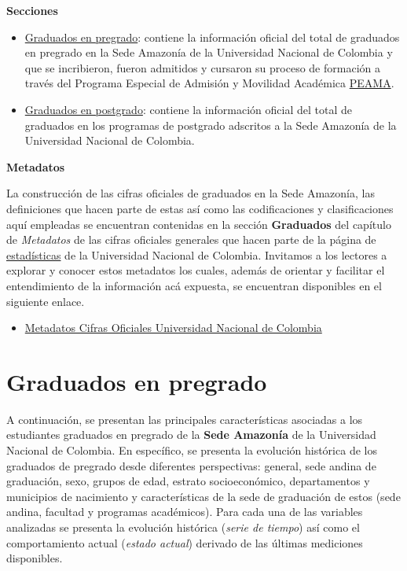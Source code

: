 \documentclass[
]{book}
\providecommand{\tightlist}{%
  \setlength{\itemsep}{0pt}\setlength{\parskip}{0pt}}
\begin{document}
\textbf{Secciones}

\begin{itemize}
\item
  \protect\hyperlink{GraPre}{Graduados en pregrado}: contiene la información oficial del total de graduados en pregrado en la Sede Amazonía de la Universidad Nacional de Colombia y que se incribieron, fueron admitidos y cursaron su proceso de formación a través del Programa Especial de Admisión y Movilidad Académica \protect\hyperlink{peama}{PEAMA}.
\item
  \protect\hyperlink{GraPos}{Graduados en postgrado}: contiene la información oficial del total de graduados en los programas de postgrado adscritos a la Sede Amazonía de la Universidad Nacional de Colombia.
\end{itemize}

\textbf{Metadatos}

La construcción de las cifras oficiales de graduados en la Sede Amazonía, las definiciones que hacen parte de estas así como las codificaciones y clasificaciones aquí empleadas se encuentran contenidas en la sección \textbf{Graduados} del capítulo de \emph{Metadatos} de las cifras oficiales generales que hacen parte de la página de \href{http://estadisticas.unal.edu.co/home/}{estadísticas} de la Universidad Nacional de Colombia. Invitamos a los lectores a explorar y conocer estos metadatos los cuales, además de orientar y facilitar el entendimiento de la información acá expuesta, se encuentran disponibles en el siguiente enlace.

\begin{itemize}
\tightlist
\item
  \href{http://estadisticas.unal.edu.co/menu-principal/cifras-generales/metadatos/cifras-generales/}{Metadatos Cifras Oficiales Universidad Nacional de Colombia}
\end{itemize}

\hypertarget{GraPre}{%
\section{Graduados en pregrado}\label{GraPre}}

A continuación, se presentan las principales características asociadas a los estudiantes graduados en pregrado de la \textbf{Sede Amazonía} de la Universidad Nacional de Colombia. En específico, se presenta la evolución histórica de los graduados de pregrado desde diferentes perspectivas: general, sede andina de graduación, sexo, grupos de edad, estrato socioeconómico, departamentos y municipios de nacimiento y características de la sede de graduación de estos (sede andina, facultad y programas académicos). Para cada una de las variables analizadas se presenta la evolución histórica (\emph{serie de tiempo}) así como el comportamiento actual (\emph{estado actual}) derivado de las últimas mediciones disponibles.
\end{document}
